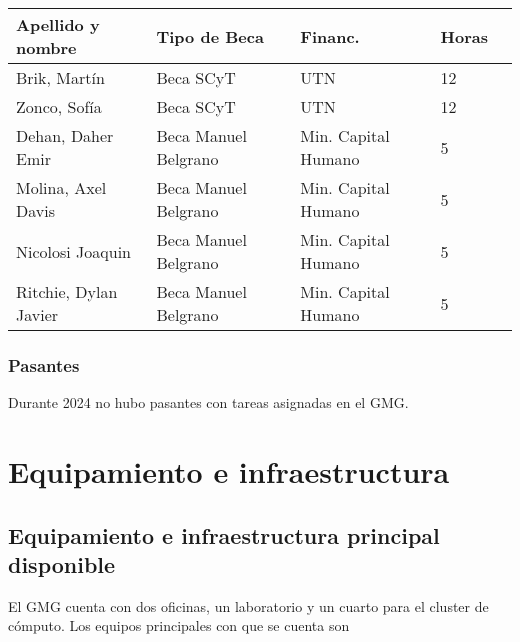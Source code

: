 \documentclass[a4paper,11pt,twoside,final,titlepage,onecolumn,openright]{report}
\begin{document}
\begin{tabular}{l l l l r}
\toprule
Apellido y nombre & Tipo de Beca & Financ. & Horas \\
\midrule
Brik, Martín & Beca SCyT & UTN & 12 \\
Zonco, Sofía & Beca SCyT & UTN & 12 \\
Dehan, Daher Emir & Beca Manuel Belgrano & Min. Capital Humano & 5 \\
Molina, Axel Davis & Beca Manuel Belgrano & Min. Capital Humano & 5 \\
Nicolosi Joaquin & Beca Manuel Belgrano & Min. Capital Humano & 5 \\
Ritchie, Dylan Javier & Beca Manuel Belgrano & Min. Capital Humano & 5 \\
\bottomrule 
\end{tabular}

 \subsubsection{Pasantes}

 Durante 2024 no hubo pasantes con tareas asignadas en el GMG.

\normalsize


\section{Equipamiento e infraestructura}

\subsection{Equipamiento e infraestructura principal disponible}

El GMG cuenta con dos oficinas, un laboratorio y un cuarto para el cluster de cómputo. Los equipos principales con que se cuenta son
\end{document}
